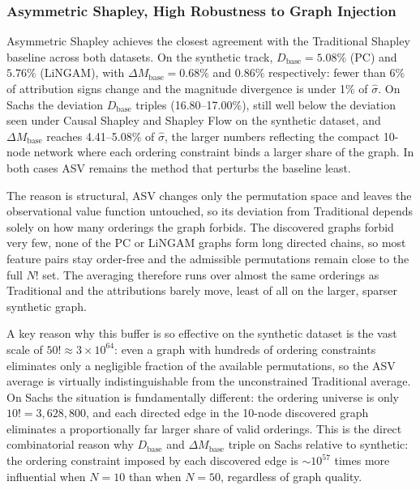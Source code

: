 \documentclass[12pt,a4paper,oneside]{article}
\begin{document}
\subsubsection{Asymmetric Shapley, High Robustness to Graph Injection}

Asymmetric Shapley achieves the closest agreement with the Traditional Shapley baseline across both datasets. On the synthetic track, $D_{\text{base}} = 5.08\%$ (PC) and $5.76\%$ (LiNGAM), with $\Delta M_{\text{base}} = 0.68\%$ and $0.86\%$ respectively: fewer than 6\% of attribution signs change and the magnitude divergence is under 1\% of $\hat{\sigma}$. On Sachs the deviation $D_{\text{base}}$ triples (16.80--17.00\%), still well below the deviation seen under Causal Shapley and Shapley Flow on the synthetic dataset, and $\Delta M_{\text{base}}$ reaches 4.41--5.08\% of $\hat{\sigma}$, the larger numbers reflecting the compact 10-node network where each ordering constraint binds a larger share of the graph. In both cases ASV remains the method that perturbs the baseline least.

The reason is structural, ASV changes only the permutation space and leaves the observational value function untouched, so its deviation from Traditional depends solely on how many orderings the graph forbids. The discovered graphs forbid very few, none of the PC or LiNGAM graphs form long directed chains, so most feature pairs stay order-free and the admissible permutations remain close to the full $N!$ set. The averaging therefore runs over almost the same orderings as Traditional and the attributions barely move, least of all on the larger, sparser synthetic graph.

A key reason why this buffer is so effective on the synthetic dataset is the vast scale of $50! \approx 3 \times 10^{64}$: even a graph with hundreds of ordering constraints eliminates only a negligible fraction of the available permutations, so the ASV average is virtually indistinguishable from the unconstrained Traditional average. On Sachs the situation is fundamentally different: the ordering universe is only $10! = 3{,}628{,}800$, and each directed edge in the 10-node discovered graph eliminates a proportionally far larger share of valid orderings. This is the direct combinatorial reason why $D_{\text{base}}$ and $\Delta M_{\text{base}}$ triple on Sachs relative to synthetic: the ordering constraint imposed by each discovered edge is $\sim\!10^{57}$ times more influential when $N = 10$ than when $N = 50$, regardless of graph quality.
\end{document}
